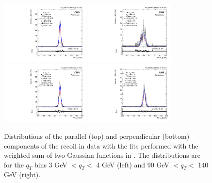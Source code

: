 \begin{figure}
\begin{center}
\includegraphics[width=0.4\textwidth]{Figures/WBoson/Analysis/Correction/Recoil/RecoilFits/Data/pfu1fit_2.pdf}
\includegraphics[width=0.4\textwidth]{Figures/WBoson/Analysis/Correction/Recoil/RecoilFits/Data/pfu1fit_29.pdf} \\
\includegraphics[width=0.4\textwidth]{Figures/WBoson/Analysis/Correction/Recoil/RecoilFits/Data/pfu2fit_2.pdf}
\includegraphics[width=0.4\textwidth]{Figures/WBoson/Analysis/Correction/Recoil/RecoilFits/Data/pfu2fit_29.pdf}
\caption{Distributions of the parallel (top) and perpendicular (bottom) components of the recoil in data with the fits performed with the weighted sum of two Gaussian functions in . The distributions are for the $q_{T}$
bins 3 GeV $< q_{T} <$ 4 GeV (left) and 90 GeV $< q_{T} <$ 140 GeV (right).}
\label{fig:RecoilFitsData}
\end{center}
\end{figure}


